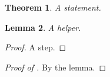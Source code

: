 \documentclass{article}
\newtheorem{thm}{Theorem}
\newtheorem{lemma}[thm]{Lemma}
\begin{document}
\begin{thm}
A statement.
\end{thm}
\begin{lemma}
A helper.
\end{lemma}
\begin{proof}
A step.
\end{proof}
\begin{proof}[Proof of ]
By the lemma.
\end{proof}
\end{document}
